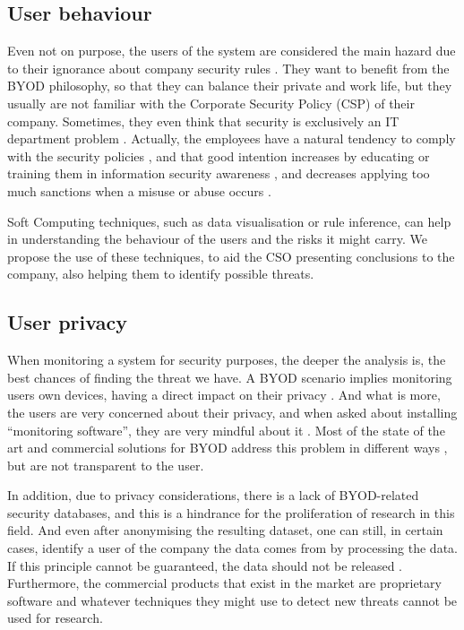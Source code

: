 \subsection{User behaviour}
\label{subsec:behav}

Even not on purpose, the users of the system are considered the main hazard due to their ignorance about company security rules  \cite{Adams_users99}. They want to benefit from the BYOD philosophy, so that they can balance their private and work life, but they usually are not familiar with the Corporate Security Policy (CSP) of their company. Sometimes, they even think that security is exclusively an IT department problem \cite{thomson2012byod}.  Actually, the employees have a natural tendency to comply with the security policies \cite{Sip_SecPriv07,Bulg_SecPol10,AlOmari_SecPol12}, and that good intention increases by educating or training them in information security awareness  \cite{Shaw_SecAware09}, and decreases applying too much sanctions when a misuse or abuse occurs \cite{Her_SecPol09}.

Soft Computing techniques, such as data visualisation or rule inference, can help in understanding the behaviour of the users and the risks it might carry. We propose the use of these techniques, to aid the CSO presenting conclusions to the company, also helping them to identify possible threats.

\subsection{User privacy}
\label{subsec:user_priv}

When monitoring a system for security purposes, the deeper the analysis is, the best chances of finding the threat we have. A BYOD scenario implies monitoring users own devices, having a direct impact on their privacy \cite{Miller12Privacy}. And what is more, the users are very concerned about their privacy, and when asked about installing ``monitoring software'', they are very mindful about it \cite{Miller12Privacy, ali2015analysis}. Most of the state of the art and commercial solutions for BYOD address this problem in different ways \cite{de2015corporate}, but are not transparent to the user. 

In addition, due to privacy considerations, there is a lack of BYOD-related security databases, and this is a hindrance for the proliferation of research in this field. And even after anonymising the resulting dataset, one can still, in certain cases, identify a user of the company the data comes from by processing the data. If this principle cannot be guaranteed, the data should not be released \cite{boillat2014handbook}. Furthermore, the commercial products that exist in the market \cite{de2015corporate} are proprietary software and whatever techniques they might use to detect new threats cannot be used for research.

